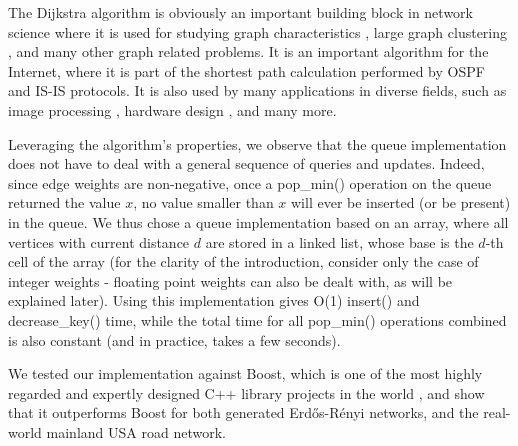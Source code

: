 \documentclass[conference,10pt,twocolumn]{IEEEtran}
\begin{document}
The Dijkstra algorithm is obviously an important building block in network science where it is used for studying graph characteristics \cite{example-JJ,example-BIU}, large graph clustering \cite{BSWW14}, and many other graph related problems.  It is an important algorithm for the Internet, where it is
part of the shortest path calculation performed by OSPF \cite{ospf} and IS-IS \cite{is-is} protocols. It is also used by many applications in diverse fields, such as image processing \cite{avidan2007seam}, hardware design \cite{example-Cidon}, and many more.

Leveraging the algorithm's properties, we observe that the queue implementation does not have to deal with a general sequence of queries and updates. Indeed, since edge weights are non-negative, once a pop\_min() operation on the queue returned the value $x$, no value smaller than $x$ will ever be inserted (or be present) in the queue. We thus chose a queue implementation based on an array, where all vertices with current distance $d$ are stored in a linked list, whose base is the $d$-th cell of the array (for the clarity of the introduction, consider only the case of integer weights - floating point weights can also be dealt with, as will be explained later). Using this implementation gives O(1) insert() and decrease\_key() time, while the total time for all pop\_min() operations combined is also constant (and in practice, takes a few seconds).

We tested our implementation against Boost, which is one of the most highly regarded and expertly designed C++ library projects in the world \cite{Boost-brag}, and show that it outperforms Boost for both generated Erd\H{o}s-R\'{e}nyi networks, and the real-world mainland USA road network.
\end{document}
